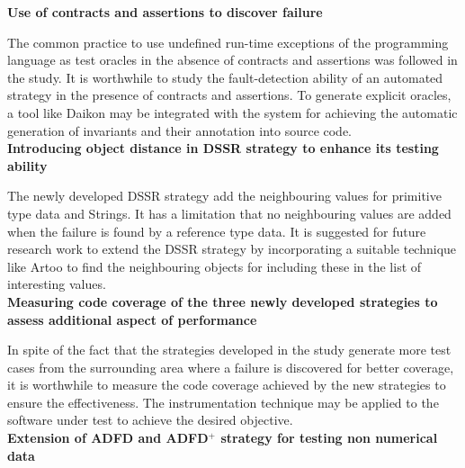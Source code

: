 \textbf{Use of contracts and assertions to discover failure}

The common practice to use undefined run-time exceptions of the programming language as test oracles in the absence of contracts and assertions was followed in the study. It is worthwhile to study the fault-detection ability of an automated strategy in the presence of contracts and assertions. To generate explicit oracles, a tool like Daikon may be integrated with the system for achieving the automatic generation of invariants and their annotation into source code.\\

\textbf{Introducing object distance in DSSR strategy to enhance its testing ability}

The newly developed DSSR strategy add the neighbouring values for primitive type data and Strings. It has a limitation that no neighbouring values are added when the failure is found by  a reference type data. It is suggested for future research work to extend the DSSR strategy by incorporating a suitable technique like Artoo to find the neighbouring objects for including these in the list of interesting values.  \\


\textbf{Measuring code coverage of the three newly developed strategies to assess additional aspect of performance}

In spite of the fact that the strategies developed in the study generate more test cases from the surrounding area where a failure is discovered for better coverage, it is worthwhile to measure the code coverage achieved by the new strategies to ensure the effectiveness. The instrumentation technique may be applied to the software under test to achieve the desired objective. \\

\textbf{Extension of ADFD and ADFD$^+$ strategy for testing non numerical data}

